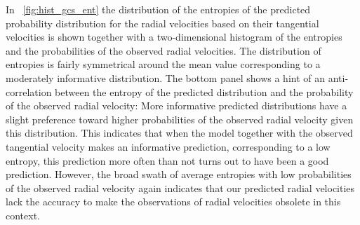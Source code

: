 In \figurename~\ref{fig:hist_gcs_ent} the distribution of the
entropies of the predicted probability distribution for the radial
velocities based on their tangential velocities is shown together with
a two-dimensional histogram of the entropies and the probabilities of
the observed radial velocities. The distribution of entropies is
fairly symmetrical around the mean value corresponding to a moderately
informative distribution. The bottom panel shows a hint of an
anti-correlation between the entropy of the predicted distribution and
the probability of the observed radial velocity: More informative
predicted distributions have a slight preference toward higher
probabilities of the observed radial velocity given this
distribution. This indicates that when the model together with the
observed tangential velocity makes an informative prediction,
corresponding to a low entropy, this prediction more often than not
turns out to have been a good prediction. However, the broad swath of
average entropies with low probabilities of the observed radial
velocity again indicates that our predicted radial velocities lack the
accuracy to make the observations of radial velocities obsolete in
this context.


